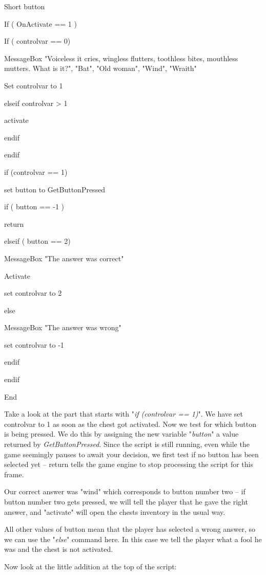 \documentclass[
]{article}
\begin{document}
Short button

If ( OnActivate == 1 )

If ( controlvar == 0)

MessageBox "Voiceless it cries, wingless flutters, toothless bites,
mouthless mutters. What is it?", "Bat", "Old woman", "Wind", "Wraith"

Set controlvar to 1

elseif controlvar \textgreater{} 1

activate

endif

endif

if (controlvar == 1)

set button to GetButtonPressed

if ( button == -1 )

return

elseif ( button == 2)

MessageBox "The answer was correct"

Activate

set controlvar to 2

else

MessageBox "The answer was wrong"

set controlvar to -1

endif

endif

End

Take a look at the part that starts with "\emph{if (controlvar == 1)}".
We have set controlvar to 1 as soon as the chest got activated. Now we
test for which button is being pressed. We do this by assigning the new
variable "\emph{button}" a value returned by \emph{GetButtonPressed}.
Since the script is still running, even while the game seemingly pauses
to await your decision, we first test if no button has been selected yet
-- return tells the game engine to stop processing the script for this
frame.

Our correct answer was "wind" which corresponds to button number two --
if button number two gets pressed, we will tell the player that he gave
the right answer, and "activate" will open the chests inventory in the
usual way.

All other values of button mean that the player has selected a wrong
answer, so we can use the "\emph{else}" command here. In this case we
tell the player what a fool he was and the chest is not activated.

Now look at the little addition at the top of the script:
\end{document}

